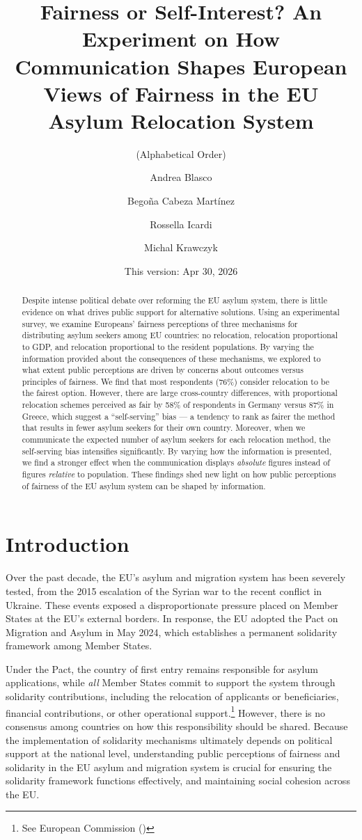 \documentclass[
  12pt,
  a4paper,
]{article}
\title{Fairness or Self-Interest? An Experiment on How Communication Shapes European Views of Fairness in the EU Asylum Relocation System}
\author{(Alphabetical Order) \and Andrea Blasco \and Begoña Cabeza Martínez \and Rossella Icardi \and Michal Krawczyk}
\date{This version: Apr 30, 2026}
\begin{document}
\maketitle
\begin{abstract}
Despite intense political debate over reforming the EU asylum system, there is little evidence on what drives public support for alternative solutions. Using an experimental survey, we examine Europeans' fairness perceptions of three mechanisms for distributing asylum seekers among EU countries: no relocation, relocation proportional to GDP, and relocation proportional to the resident populations. By varying the information provided about the consequences of these mechanisms, we explored to what extent public perceptions are driven by concerns about outcomes versus principles of fairness. We find that most respondents (76\%) consider relocation to be the fairest option. However, there are large cross-country differences, with proportional relocation schemes perceived as fair by 58\% of respondents in Germany versus 87\% in Greece, which suggest a ``self-serving'' bias --- a tendency to rank as fairer the method that results in fewer asylum seekers for their own country. Moreover, when we communicate the expected number of asylum seekers for each relocation method, the self-serving bias intensifies significantly. By varying how the information is presented, we find a stronger effect when the communication displays \emph{absolute} figures instead of figures \emph{relative} to population. These findings shed new light on how public perceptions of fairness of the EU asylum system can be shaped by information.
\end{abstract}

\clearpage

\section{Introduction}\label{introduction}

Over the past decade, the EU's asylum and migration system has been severely tested, from the 2015 escalation of the Syrian war to the recent conflict in Ukraine. These events exposed a disproportionate pressure placed on Member States at the EU's external borders. In response, the EU adopted the Pact on Migration and Asylum in May 2024, which establishes a permanent solidarity framework among Member States.

Under the Pact, the country of first entry remains responsible for asylum applications, while \emph{all} Member States commit to support the system through solidarity contributions, including the relocation of applicants or beneficiaries, financial contributions, or other operational support.\footnote{See European Commission ()} However, there is no consensus among countries on how this responsibility should be shared. Because the implementation of solidarity mechanisms ultimately depends on political support at the national level, understanding public perceptions of fairness and solidarity in the EU asylum and migration system is crucial for ensuring the solidarity framework functions effectively, and maintaining social cohesion across the EU.
\end{document}
